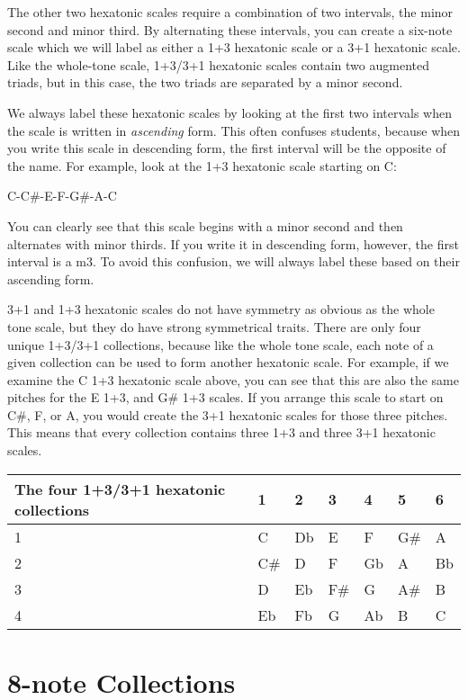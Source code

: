 \documentclass{book}
\begin{document}
The other two hexatonic scales require a combination of two intervals, the
minor second and minor third. By alternating these intervals, you can create a
six-note scale which we will label as either a 1+3 hexatonic scale or a 3+1
hexatonic scale. Like the whole-tone scale, 1+3/3+1 hexatonic scales contain
two augmented triads, but in this case, the two triads are separated by a
minor second.

We always label these hexatonic scales by looking at the first two intervals
when the scale is written in \emph{ascending} form. This often confuses
students, because when you write this scale in descending form, the first
interval will be the opposite of the name. For example, look at the 1+3
hexatonic scale starting on C:

C-C\#-E-F-G\#-A-C

You can clearly see that this scale begins with a minor second and then
alternates with minor thirds. If you write it in descending form, however, the
first interval is a m3. To avoid this confusion, we will always label these
based on their ascending form.

3+1 and 1+3 hexatonic scales do not have symmetry as obvious as the whole tone
scale, but they do have strong symmetrical traits. There are only four unique
1+3/3+1 collections, because like the whole tone scale, each note of a given
collection can be used to form another hexatonic scale. For example, if we
examine the C 1+3 hexatonic scale above, you can see that this are also the
same pitches for the E 1+3, and G\# 1+3 scales. If you arrange this scale to
start on C\#, F, or A, you would create the 3+1 hexatonic scales for those
three pitches. This means that every collection contains three 1+3 and three
3+1 hexatonic scales.

\begin{longtable}[]{@{}lllllll@{}}
\toprule
The four 1+3/3+1 hexatonic collections & 1 & 2 & 3 & 4 & 5 & 6 \\
\midrule
\endhead
1 & C & Db & E & F & G\# & A \\
2 & C\# & D & F & Gb & A & Bb \\
3 & D & Eb & F\# & G & A\# & B \\
4 & Eb & Fb & G & Ab & B & C \\
\bottomrule
\end{longtable}

\hypertarget{note-collections-2}{%
\section{8-note Collections}\label{note-collections-2}}
\end{document}
